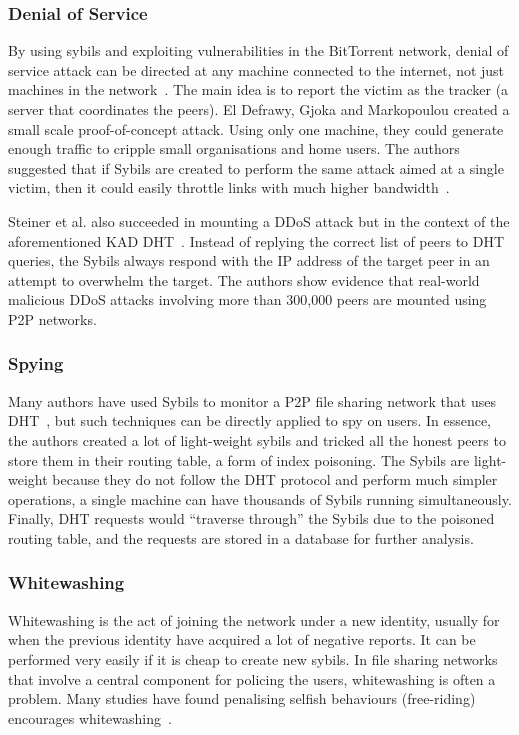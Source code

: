 \subsubsection{Denial of Service}
By using sybils and exploiting vulnerabilities in the BitTorrent network, denial
of service attack can be directed at any machine connected to the internet, not
just machines in the network~\cite{sia2006ddos}. The main idea is to report the
victim as the tracker (a server that coordinates the peers). El Defrawy, Gjoka
and Markopoulou created a small scale proof-of-concept attack. Using only one
machine, they could generate enough traffic to cripple small organisations and
home users. The authors suggested that if Sybils are created to perform the same
attack aimed at a single victim, then it could easily throttle links with much
higher bandwidth~\cite{el2007bottorrent}.

Steiner et al. also succeeded in mounting a DDoS attack but in the context of
the aforementioned KAD DHT~\cite{steiner2007exploiting}. Instead of replying the
correct list of peers to DHT queries, the Sybils always respond with the IP
address of the target peer in an attempt to overwhelm the target. The authors
show evidence that real-world malicious DDoS attacks involving more than 300,000
peers are mounted using P2P networks.

\subsubsection{Spying}
Many authors have used Sybils to monitor a P2P file sharing network that uses
DHT~\cite{holz2008measurements, steiner2007exploiting}, but such techniques can
be directly applied to spy on users. In essence, the authors created a lot of
light-weight sybils and tricked all the honest peers to store them in their
routing table, a form of index poisoning. The Sybils are light-weight because
they do not follow the DHT protocol and perform much simpler operations, a
single machine can have thousands of Sybils running simultaneously. Finally, DHT
requests would ``traverse through'' the Sybils due to the poisoned routing
table, and the requests are stored in a database for further analysis.

\subsubsection{Whitewashing}
Whitewashing is the act of joining the network under a new identity, usually for
when the previous identity have acquired a lot of negative reports. It can be
performed very easily if it is cheap to create new sybils. In file sharing
networks that involve a central component for policing the users, whitewashing
is often a problem. Many studies have found penalising selfish behaviours
(free-riding) encourages whitewashing~\cite{feldman2004free, yang2005empirical}.

